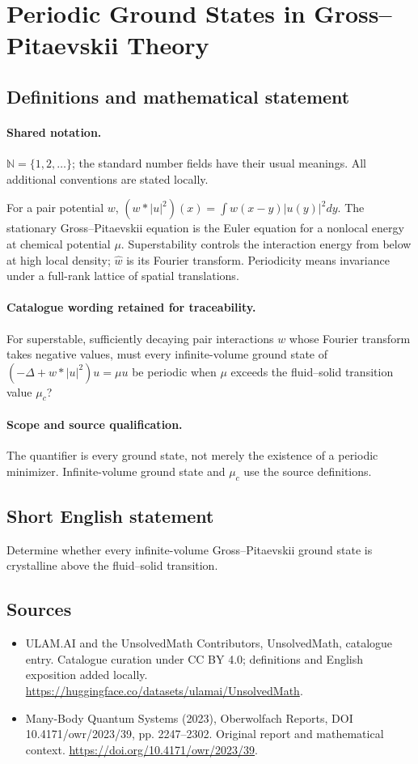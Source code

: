 \documentclass[11pt]{article}
\begin{document}
\section{Periodic Ground States in Gross–Pitaevskii Theory}\label{statement}

\subsection{Definitions and mathematical statement}

\paragraph{Shared notation.}$\mathbb N=\{1,2,\ldots\}$; the standard number fields have their usual meanings. All additional conventions are stated locally.


For a pair potential $w$, $(w*|u|^2)(x)=\int w(x-y)|u(y)|^2dy$. The stationary Gross--Pitaevskii equation is the Euler equation for a nonlocal energy at chemical potential $\mu$. Superstability controls the interaction energy from below at high local density; $\widehat w$ is its Fourier transform. Periodicity means invariance under a full-rank lattice of spatial translations.

\paragraph{Catalogue wording retained for traceability.}
For superstable, sufficiently decaying pair interactions $w$ whose Fourier transform takes negative values, must every infinite-volume ground state of $(-\Delta+w*|u|^2)u=\mu u$ be periodic when $\mu$ exceeds the fluid–solid transition value $\mu_c$?

\paragraph{Scope and source qualification.}The quantifier is every ground state, not merely the existence of a periodic minimizer. Infinite-volume ground state and $\mu_c$ use the source definitions.
\subsection{Short English statement}
Determine whether every infinite-volume Gross--Pitaevskii ground state is crystalline above the fluid--solid transition.
\subsection{Sources}
\begin{itemize}
\item[\hypertarget{source:statement:1}{S1}] ULAM.AI and the UnsolvedMath Contributors, UnsolvedMath, catalogue entry. Catalogue curation under CC BY 4.0; definitions and English exposition added locally.
\url{https://huggingface.co/datasets/ulamai/UnsolvedMath}.
\item[\hypertarget{source:statement:2}{S2}] Many-Body Quantum Systems (2023), Oberwolfach Reports, DOI 10.4171/owr/2023/39, pp. 2247--2302. Original report and mathematical context.
\url{https://doi.org/10.4171/owr/2023/39}.
\end{itemize}
\label{end:statement}
\end{document}
